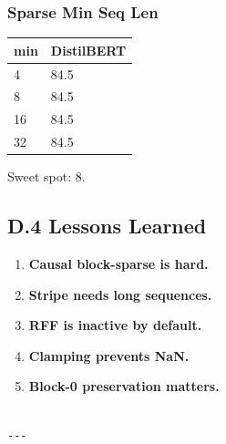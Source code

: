 \subsubsection{Sparse Min Seq Len}

\begin{table}[H]
\centering
\small
\begin{tabular}{ll}
\toprule
\textbf{min} & \textbf{DistilBERT} \\
\midrule
4 & 84.5 \\
8 & 84.5 \\
16 & 84.5 \\
32 & 84.5 \\
\bottomrule
\end{tabular}
\end{table}

Sweet spot: 8.

\subsection{D.4 Lessons Learned}

\begin{enumerate}
\item \textbf{Causal block-sparse is hard.}
\item \textbf{Stripe needs long sequences.}
\item \textbf{RFF is inactive by default.}
\item \textbf{Clamping prevents NaN.}
\item \textbf{Block-0 preservation matters.}
\end{enumerate}
\begin{lstlisting}

---
\end{lstlisting}